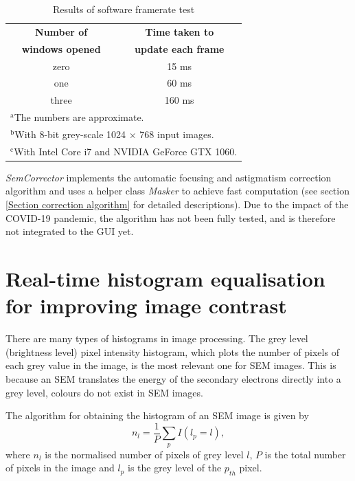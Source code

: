 \documentclass[12pt, conference]{IEEEtran}
\begin{document}
\begin{table}[htbp]
    \caption{Results of software framerate test}
    \begin{center}
    \begin{tabular}{|c|c|}
    \hline
    \textbf{Number of} & \textbf{Time taken to} \\
    \textbf{windows opened} & \textbf{update each frame} \\
    \hline
    zero & 15 ms \\
    \hline
    one & 60 ms \\
    \hline
    three & 160 ms \\
    \hline
    \multicolumn{2}{l}{$^{\mathrm{a}}$The numbers are approximate.} \\
    \multicolumn{2}{l}{$^{\mathrm{b}}$With 8-bit grey-scale 1024 $\times$ 768 input images.} \\
    \multicolumn{2}{l}{$^{\mathrm{c}}$With Intel Core i7 and NVIDIA GeForce GTX 1060.}
    \end{tabular}
    \label{Software framerates}
    \end{center}
\end{table}

\textit{SemCorrector} implements the automatic focusing and astigmatism correction algorithm and uses a helper class \textit{Masker} to achieve fast computation (see section \ref{Section correction algorithm} for detailed descriptions). Due to the impact of the COVID-19 pandemic, the algorithm has not been fully tested, and is therefore not integrated to the GUI yet.

\section{Real-time histogram equalisation for improving image contrast}
\label{Section histogram equalisation}
There are many types of histograms in image processing. The grey level (brightness level) pixel intensity histogram, which plots the number of pixels of each grey value in the image, is the most relevant one for SEM images. This is because an SEM translates the energy of the secondary electrons directly into a grey level, colours do not exist in SEM images.

The algorithm for obtaining the histogram of an SEM image is given by
\begin{equation}
    n_l = \frac{1}{P} \sum_{p} I(l_p=l),
\end{equation}
where $n_l$ is the normalised number of pixels of grey level $l$, $P$ is the total number of pixels in the image and $l_p$ is the grey level of the $p_{th}$ pixel. 
\end{document}
